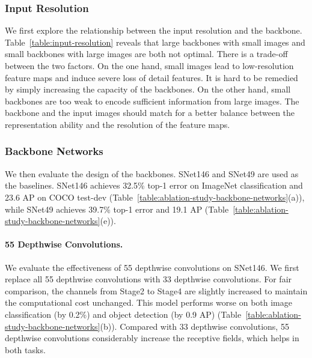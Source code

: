 \subsubsection{Input Resolution}
\label{section:ablation-study-input-resolution}

We first explore the relationship between the input resolution and the backbone.
Table~\ref{table:input-resolution} reveals that large backbones with small images and small backbones with large images are both not optimal.
There is a trade-off between the two factors.
On the one hand, small images lead to low-resolution feature maps and induce severe loss of detail features.
It is hard to be remedied by simply increasing the capacity of the backbones.
On the other hand, small backbones are too weak to encode sufficient information from large images.
The backbone and the input images should match for a better balance between the representation ability and the resolution of the feature maps.

\vspace{-5pt}
\subsubsection{Backbone Networks}
\label{section:ablation-study-backbone-networks}

We then evaluate the design of the backbones.
SNet146 and SNet49 are used as the baselines.
SNet146 achieves 32.5\% top-1 error on ImageNet classification and 23.6 AP on COCO test-dev (Table~\ref{table:ablation-study-backbone-networks}(a)), while SNet49 achieves 39.7\% top-1 error and 19.1 AP (Table~\ref{table:ablation-study-backbone-networks}(e)).

\vspace{-12pt}
\paragraph{55 Depthwise Convolutions.}

We evaluate the effectiveness of 55 depthwise convolutions on SNet146.
We first replace all 55 depthwise convolutions with 33 depthwise convolutions.
For fair comparison, the channels from Stage2 to Stage4 are slightly increased to maintain the computational cost unchanged.
This model performs worse on both image classification (by 0.2\%) and object detection (by 0.9 AP) (Table~\ref{table:ablation-study-backbone-networks}(b)).
Compared with 33 depthwise convolutions, 55 depthwise convolutions considerably increase the receptive fields, which helps in both tasks.

